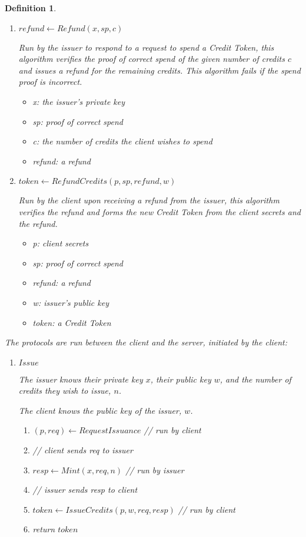 \documentclass{article}
\newtheorem{definition}{Definition}
\begin{document}
\begin{definition}
\begin{enumerate}
    \item $refund \leftarrow Refund(x, sp, c)$

        Run by the issuer to respond to a request to spend a Credit Token, this
        algorithm verifies the proof of correct spend of the given number of
        credits $c$ and issues a refund for the remaining credits. This
        algorithm fails if the spend proof is incorrect.

    \begin{itemize}
        \item x: the issuer's private key
        \item sp: proof of correct spend
        \item c: the number of credits the client wishes to spend
        \item refund: a refund
    \end{itemize}

    \item $token \leftarrow RefundCredits(p, sp, refund, w)$

        Run by the client upon receiving a refund from the issuer, this algorithm
        verifies the refund and forms the new Credit Token from the client secrets
        and the refund.

    \begin{itemize}
        \item p: client secrets
        \item sp: proof of correct spend
        \item refund: a refund
        \item w: issuer's public key
        \item token: a Credit Token
    \end{itemize}

\end{enumerate}

The protocols are run between the client and the server, initiated by the client:

\begin{enumerate}
    \item $Issue$

        The issuer knows their private key $x$, their public key $w$, and the number of
        credits they wish to issue, $n$.

        The client knows the public key of the issuer, $w$.

        \begin{enumerate}
            \item[] $(p, req) \leftarrow RequestIssuance$ // run by client
            \item[] // client sends req to issuer
            \item[] $resp \leftarrow Mint(x, req, n)$ // run by issuer
            \item[] // issuer sends resp to client
            \item[] $token \leftarrow IssueCredits(p, w, req, resp)$ // run by client
            \item[] return $token$
        \end{enumerate}


\end{enumerate}
\end{definition}
\end{document}
